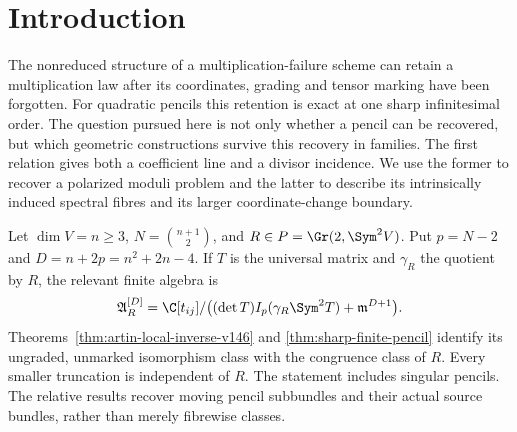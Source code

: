 \begin{abstract}
Every complex quadratic pencil is recovered from its unmarked,
ungraded finite multiplication-failure algebra at a sharp order.
We identify the intrinsic Pluecker polarization of this inverse and
its projective GIT completion. On the regular-pencil stack, a tower
of spectral Fitting divisors is realized as binary normalization
fibres; their successive local lengths recover the full Segre
symbol. We then study the common-divisor geometry of first relations.
The binary normalization is finite flat on each exact-gcd stratum,
with all collision fibres explicitly determined. On the squarefree
locus we compute the conductor, branch intersections and graded
Betti numbers. Arbitrary collisions have a completed incidence
presentation. In every embedding dimension the multivariate
pure-power fibres admit a determinant-apolar quotient, giving a
uniform length bound. The first multivariate two-factor fibre has
length 22, type 7 and an explicit weighted Betti table. These results
distinguish native pencil degeneration from the common extreme
limit under all cotangent coordinate changes.
\end{abstract}
\maketitle

\section{Introduction}
\label{sec:introduction-v153}
The nonreduced structure of a multiplication-failure scheme can
retain a multiplication law after its coordinates, grading and
tensor marking have been forgotten. For quadratic pencils this
retention is exact at one sharp infinitesimal order. The question
pursued here is not only whether a pencil can be recovered, but
which geometric constructions survive this recovery in families.
The first relation gives both a coefficient line and a divisor
incidence. We use the former to recover a polarized moduli problem
and the latter to describe its intrinsically induced spectral
fibres and its larger coordinate-change boundary.

Let $\dim V=n\geq3$, $N=\binom{n+1}{2}$, and
$R\in P=\Gr(2,\Sym^2V)$. Put $p=N-2$ and
$D=n+2p=n^2+2n-4$. If $T$ is the universal matrix and $\gamma_R$
the quotient by $R$, the relevant finite algebra is
\[
 \mathfrak A_R^{[D]}=
 \C[t_{ij}]/\bigl((\det T)I_p(\gamma_R\Sym^2T)
                                      +\mathfrak m^{D+1}\bigr).
\]
Theorems~\ref{thm:artin-local-inverse-v146} and
\ref{thm:sharp-finite-pencil} identify its ungraded, unmarked
isomorphism class with the congruence class of $R$. Every smaller
truncation is independent of $R$. The statement includes singular
pencils. The relative results recover moving pencil subbundles and
their actual source bundles, rather than merely fibrewise classes.

